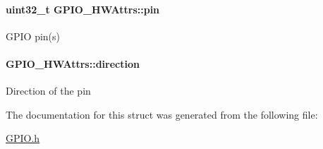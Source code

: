 \paragraph[{pin}]{\setlength{\rightskip}{0pt plus 5cm}uint32\-\_\-t G\-P\-I\-O\-\_\-\-H\-W\-Attrs\-::pin}\label{struct_g_p_i_o___h_w_attrs_a09449e8ca5638cff72585a8631cf9286}
G\-P\-I\-O pin(s) 
\paragraph[{direction}]{ G\-P\-I\-O\-\_\-\-H\-W\-Attrs\-::direction}\label{struct_g_p_i_o___h_w_attrs_ac48f6d3d51454e458c448f9cead7485e}
Direction of the pin 

The documentation for this struct was generated from the following file\-:\begin{DoxyCompactItemize}
\item 
\hyperlink{_g_p_i_o_8h}{G\-P\-I\-O.\-h}\end{DoxyCompactItemize}
